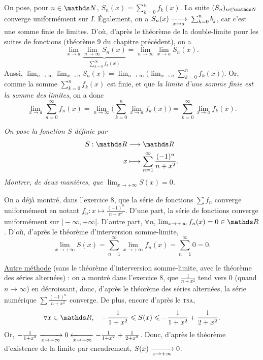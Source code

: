 \begin{prv}
	On pose, pour $n \in \N$, $S_n(x) = \sum_{k=0}^n f_k(x)$. La suite $(S_n)_{n\in\N}$\/ converge uniformément sur $I$. Également, on a $S_n(x) \xrightarrow[x\to a]{}\:\sum_{k=0}^n b_j$, car c'est une somme finie de limites. D'où, d'après le théorème de la double-limite pour les suites de fonctions (théorème 9 du chapitre précédent), on a \[
		\lim_{x\to a}\underbrace{\lim_{n\to \infty} S_n(x)}_{\sum_{k=0}^\infty f_k(x)} = \lim_{n\to \infty} \lim_{x\to a} S_n(x)
	.\]
	Aussi, $\lim_{n\to \infty} \lim_{x\to a} S_n(x) = \lim_{n\to \infty} \Big(\lim_{x\to a} \sum_{k=0}^n f_k(x)\Big)$. Or, comme la somme $\sum_{k=0}^n f_k(x)$\/ est finie, et que \textsl{la limite d'une somme finie est la somme des limites}, on a donc \[
		\lim_{x\to a} \sum_{n=0}^\infty f_n(x) = \lim_{n\to \infty} \Big(\sum_{k=0}^n \lim_{x\to a} f_k(x)\Big) = \sum_{k=0}^\infty \lim_{x\to a} f_k(x).
	\]
\end{prv}

\begin{exo}
	\textsl{On pose la fonction $S$\/ définie par \begin{align*}
		S: \R &\longrightarrow \R \\
		x &\longmapsto \sum_{n=1}^\infty \frac{(-1)^n}{n + x^2}.
	\end{align*}Montrer, de deux manières, que $\lim_{x\to +\infty} S(x) = 0$.}
	
	On a déjà montré, dans l'exercice 8, que la série de fonctions $\sum f_n$\/ converge uniformément en notant $f_n : x\mapsto \frac{(-1)^n}{n + x^2}$. D'une part, la série de fonctions converge uniformément sur ${]-\infty,+\infty[}$. D'autre part, $\forall n$, $\lim_{x\to +\infty} f_n(x) = 0 \in \R$. D'où, d'après le théorème d'interversion somme-limite, \[
		\lim_{x\to +\infty} S(x) = \sum_{n=1}^\infty \lim_{x\to +\infty} f_n(x) = \sum_{n=1}^\infty 0 = 0
	.\]

	\underline{Autre méthode} (sans le théorème d'interversion somme-limite, avec le théorème des séries alternées) : on a montré dans l'exercice 8, que $\frac{1}{n+x^2}$\/ tend vers 0 (quand $n\to \infty$) en décroissant, donc, d'après le théorème des séries alternées, la série numérique $\sum \frac{(-1)^n}{n + x^2}$\/ converge. De plus, encore d'après le \textsc{tsa}, \[
		\forall x \in \R,\quad-\frac{1}{1+x^2}\le S(x) \le -\frac{1}{1+x^2} + \frac{1}{2+x^2}
	.\] Or, $-\frac{1}{1+x^2} \xrightarrow[x\to +\infty]{} 0 \xleftarrow[x\to +\infty]{} -\frac{1}{1+x^2} + \frac{1}{2+x^2}$. Donc, d'après le théorème d'existence de la limite par encadrement, $S(x) \xrightarrow[x\to +\infty]{} 0$.
\end{exo}

